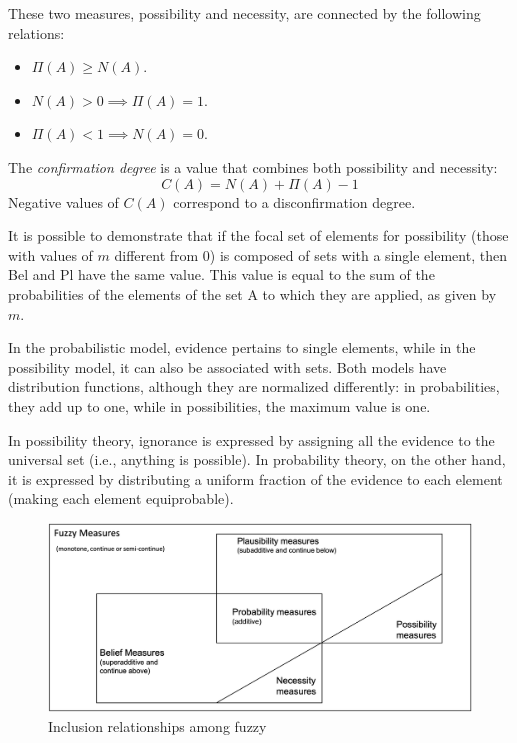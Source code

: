 \documentclass[12pt, a4paper]{report}
\begin{document}
    These two measures, possibility and necessity, are connected by the following relations:
    \begin{itemize}
        \item $\Pi(A) \geq N(A)$.
        \item $N(A) > 0 \implies \Pi(A)=1$.
        \item $\Pi(A) < 1 \implies N(A)=0$.
    \end{itemize}
    \begin{definition}
        The \emph{confirmation degree} is a value that combines both possibility and necessity:
        \[C(A)=N(A)+\Pi(A)-1\]
        Negative values of $C(A)$ correspond to a disconfirmation degree.
    \end{definition}
    It is possible to demonstrate that if the focal set of elements for possibility (those with values of $m$ different from $0$) is composed of sets with a single element, then Bel and Pl have the same value. 
    This value is equal to the sum of the probabilities of the elements of the set A to which they are applied, as given by $m$.

    In the probabilistic model, evidence pertains to single elements, while in the possibility model, it can also be associated with sets. 
    Both models have distribution functions, although they are normalized differently: in probabilities, they add up to one, while in possibilities, the maximum value is one.

    In possibility theory, ignorance is expressed by assigning all the evidence to the universal set (i.e., anything is possible). 
    In probability theory, on the other hand, it is expressed by distributing a uniform fraction of the evidence to each element (making each element equiprobable).
    \begin{figure}[H]
        \centering
        \includegraphics[width=0.75\linewidth]{images/measures.png}
        \caption{Inclusion relationships among fuzzy}
    \end{figure}

    \newpage
\end{document}
